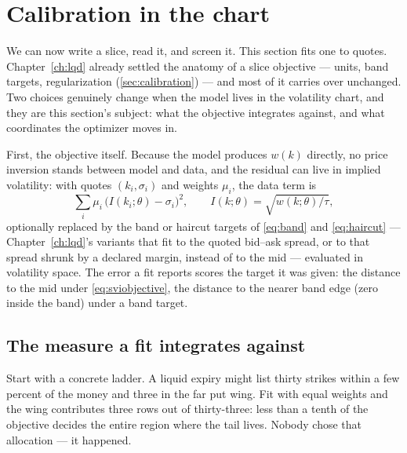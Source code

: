 \section{Calibration in the chart}
\label{sec:svicalib}

We can now write a slice, read it, and screen it.  This section fits
one to quotes.  Chapter~\ref{ch:lqd} already settled the anatomy of a
slice objective --- units, band targets, regularization
(\cref{sec:calibration}) --- and most of it carries over unchanged.
Two choices genuinely change when the model lives in the volatility
chart, and they are this section's subject: what the objective
integrates against, and what coordinates the optimizer moves in.

First, the objective itself.  Because the model produces $w(k)$
directly, no price inversion stands between model and data, and the
residual can live in implied volatility: with quotes $(k_i,\sigma_i)$
and weights $\mu_i$, the data term is
\begin{equation}
\sum_i \mu_i\,\big(I(k_i;\theta)-\sigma_i\big)^2,
\qquad I(k;\theta)=\sqrt{w(k;\theta)/\tau},
\label{eq:sviobjective}
\end{equation}
optionally replaced by the band or haircut targets of \eqref{eq:band}
and \eqref{eq:haircut} --- Chapter~\ref{ch:lqd}'s variants that fit to
the quoted bid--ask spread, or to that spread shrunk by a declared
margin, instead of to the mid --- evaluated in volatility space.  The
error a fit reports scores the target it was given: the distance to
the mid under \eqref{eq:sviobjective}, the distance to the nearer band
edge (zero inside the band) under a band target.

\subsection{The measure a fit integrates against}
\label{sec:sviweights}

Start with a concrete ladder.  A liquid expiry might list thirty
strikes within a few percent of the money and three in the far put
wing.  Fit with equal weights and the wing contributes three rows out
of thirty-three: less than a tenth of the objective decides the entire
region where the tail lives.  Nobody chose that allocation --- it
happened.

